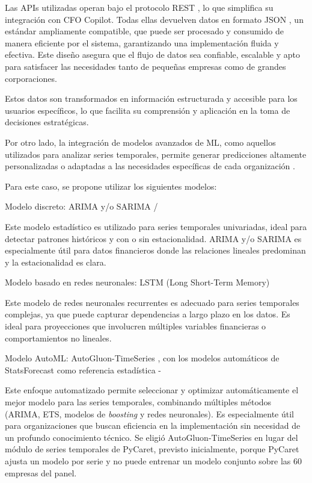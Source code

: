 \documentclass[12pt,letterpaper,oneside]{report}
\renewcommand{\_}{\UnderscoreOriginal\allowbreak}
\begin{document}
Las APIs utilizadas operan bajo el protocolo REST \parencite{Rodriguez2016}, lo que simplifica su integración con CFO Copilot. Todas ellas devuelven datos en formato JSON \parencite{Friesen2019}, un estándar ampliamente compatible, que puede ser procesado y consumido de manera eficiente por el sistema, garantizando una implementación fluida y efectiva. Este diseño asegura que el flujo de datos sea confiable, escalable y apto para satisfacer las necesidades tanto de pequeñas empresas como de grandes corporaciones.

Estos datos son transformados en información estructurada y accesible para los usuarios específicos, lo que facilita su comprensión y aplicación en la toma de decisiones estratégicas.

Por otro lado, la integración de modelos avanzados de ML, como aquellos utilizados para analizar series temporales, permite generar predicciones altamente personalizadas o adaptadas a las necesidades específicas de cada organización \parencite{Zuniga2024}.

Para este caso, se propone utilizar los siguientes modelos:

Modelo discreto: ARIMA y/o SARIMA \parencite{Fattah2018} / \parencite{Bajaj2023}

Este modelo estadístico es utilizado para series temporales univariadas, ideal para detectar patrones históricos y con o sin estacionalidad. ARIMA y/o SARIMA es especialmente útil para datos financieros donde las relaciones lineales predominan y la estacionalidad es clara.

Modelo basado en redes neuronales: LSTM (Long Short-Term Memory) \parencite{Staudemeyer2019}

Este modelo de redes neuronales recurrentes es adecuado para series temporales complejas, ya que puede capturar dependencias a largo plazo en los datos. Es ideal para proyecciones que involucren múltiples variables financieras o comportamientos no lineales.

Modelo AutoML: AutoGluon-TimeSeries \parencite{shchur2023autogluon}, con los modelos automáticos de StatsForecast como referencia estadística \parencite{Hutter2013} - \parencite{Baum2024}

Este enfoque automatizado permite seleccionar y optimizar automáticamente el mejor modelo para las series temporales, combinando múltiples métodos (ARIMA, ETS, modelos de \textit{boosting} y redes neuronales). Es especialmente útil para organizaciones que buscan eficiencia en la implementación sin necesidad de un profundo conocimiento técnico. Se eligió AutoGluon-TimeSeries en lugar del módulo de series temporales de PyCaret, previsto inicialmente, porque PyCaret ajusta un modelo por serie y no puede entrenar un modelo conjunto sobre las 60 empresas del panel.
\end{document}
